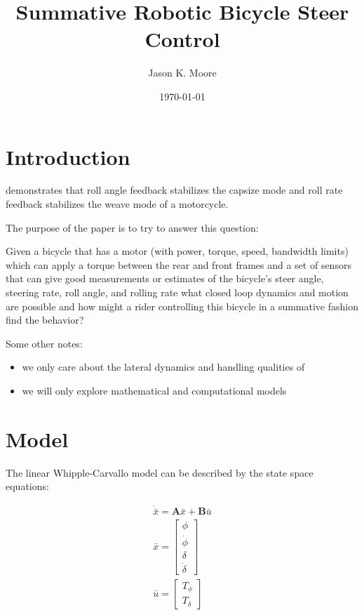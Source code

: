 \documentclass[12pt]{article}
\title{Summative Robotic Bicycle Steer Control}
\author{Jason K. Moore}
\date{\today}
\begin{document}
\maketitle

\section{Introduction}

\cite{Ruijs1986a} demonstrates that roll angle feedback stabilizes the capsize
mode and roll rate feedback stabilizes the weave mode of a motorcycle.

The purpose of the paper is to try to answer this question:

Given a bicycle that has a motor (with power, torque, speed, bandwidth limits)
which can apply a torque between the rear and front frames and a set of sensors
that can give good measurements or estimates of the bicycle's steer angle,
steering rate, roll angle, and rolling rate what closed loop dynamics and
motion are possible and how might a rider controlling this bicycle in a
summative fashion find the behavior?

Some other notes:

\begin{itemize}
  \item we only care about the lateral dynamics and handling qualities of
  \item we will only explore mathematical and computational models
\end{itemize}

\section{Model}

The linear Whipple-Carvallo model can be described by the state space
equations:

\begin{align}
  \dot{\bar{x}} = \mathbf{A} \bar{x} + \mathbf{B} \bar{u} \\
  \bar{x} = \begin{bmatrix} \phi \\ \dot{\phi} \\ \delta \\ \dot{\delta}
  \end{bmatrix} \\
  \bar{u} = \begin{bmatrix} T_{\phi} \\ T_{\delta} \end{bmatrix}
\end{align}
\end{document}
